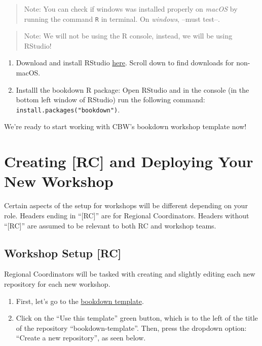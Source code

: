 \documentclass[
]{book}
\theoremstyle{definition}
\theoremstyle{definition}
\theoremstyle{definition}
\theoremstyle{definition}
\theoremstyle{remark}
\begin{document}
\begin{quote}
Note: You can check if windows was installed properly on \emph{macOS} by running the command \texttt{R} in terminal. On \emph{windows}, --must test--.
\end{quote}

\begin{quote}
Note: We will not be using the R console, instead, we will be using RStudio!
\end{quote}

\begin{enumerate}
\def\labelenumi{\arabic{enumi}.}
\setcounter{enumi}{1}
\item
  Download and install RStudio \href{https://posit.co/download/rstudio-desktop/\#:~:text=AND\%20INSTALL\%20R-,2\%3A\%20Install\%20RStudio,-DOWNLOAD\%20RSTUDIO\%20DESKTOP}{here}. Scroll down to find downloads for non-macOS.
\item
  Installl the bookdown R package: Open RStudio and in the console (in the bottom left window of RStudio) run the following command: \texttt{install.packages("bookdown")}.
\end{enumerate}

We're ready to start working with CBW's bookdown workshop template now!

\chapter{\texorpdfstring{Creating {[}RC{]} and Deploying Your \textbf{New} Workshop}{Creating {[}RC{]} and Deploying Your New Workshop}}\label{creating-rc-and-deploying-your-new-workshop}

Certain aspects of the setup for workshops will be different depending on your role. Headers ending in ``{[}RC{]}'' are for Regional Coordinators. Headers without ``{[}RC{]}'' are assumed to be relevant to both RC and workshop teams.

\section{Workshop Setup {[}RC{]}}\label{workshop-setup-rc}

Regional Coordinators will be tasked with creating and slightly editing each new repository for each new workshop.

\begin{enumerate}
\def\labelenumi{\arabic{enumi}.}
\item
  First, let's go to the \href{https://github.com/cbw-dev/bookdown-template}{bookdown template}.
\item
  Click on the ``Use this template'' green button, which is to the left of the title of the repository ``bookdown-template''. Then, press the dropdown option: ``Create a new repository'', as seen below.
\end{enumerate}
\end{document}

